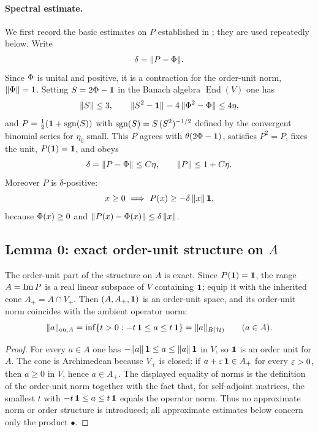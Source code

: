 \paragraph{Spectral estimate.}
We first record the basic estimates on $P$ established in ;
they are used repeatedly below. Write
\[
  \delta=\lVert P-\Phi \rVert.
\]
Since $\Phi$ is unital and positive, it is a contraction for the order-unit
norm, $\lVert \Phi \rVert=1$. Setting $S=2\Phi-\mathbf{1}$ in the Banach algebra
$\operatorname{End}(V)$ one has
\[
  \lVert S \rVert\le3,\qquad \lVert S^2-\mathbf{1} \rVert=4\,\lVert \Phi^2-\Phi \rVert\le4\eta,
\]
and $P=\tfrac12(\mathbf{1}+\operatorname{sgn}(S))$ with $\operatorname{sgn}(S)=S\,(S^2)^{-1/2}$ defined by the
convergent binomial series for $\eta_0$ small. This $P$ agrees with
$\theta(2\Phi-\mathbf{1})$, satisfies $P^2=P$, fixes the unit, $P(\mathbf{1})=\mathbf{1}$, and
obeys
\begin{equation}\label{eq:bridge-delta}
  \delta=\lVert P-\Phi \rVert\le C\eta,\qquad \lVert P \rVert\le1+C\eta.
\end{equation}
Moreover $P$ is $\delta$-positive:
\begin{equation}\label{eq:bridge-deltapos}
  x\ge0\ \Longrightarrow\ P(x)\ge-\delta\,\lVert x \rVert\,\mathbf{1},
\end{equation}
because $\Phi(x)\ge0$ and $\lVert P(x)-\Phi(x) \rVert\le\delta\,\lVert x \rVert$.

\subsection*{Lemma 0: exact order-unit structure on \texorpdfstring{$A$}{A}}

\begin{lemma}\label{lem:bridge-orderunit}
The order-unit part of the structure on $A$ is exact. Since $P(\mathbf{1})=\mathbf{1}$, the
range $A=\operatorname{Im} P$ is a real linear subspace of $V$ containing $\mathbf{1}$; equip it
with the inherited cone $A_+=A\cap V_+$. Then $(A,A_+,\mathbf{1})$ is an order-unit
space, and its order-unit norm coincides with the ambient operator norm:
\[
  \lVert a \rVert_{\mathrm{ou},A}
  =\inf\{t>0:-t\,\mathbf{1}\le a\le t\,\mathbf{1}\}
  =\lVert a \rVert_{B(\mathcal{H})}\qquad(a\in A).
\]
\end{lemma}

\begin{proof}
For every $a\in A$ one has $-\lVert a \rVert\,\mathbf{1}\le a\le\lVert a \rVert\,\mathbf{1}$ in $V$, so
$\mathbf{1}$ is an order unit for $A$. The cone is Archimedean because $V_+$ is closed:
if $a+\varepsilon\,\mathbf{1}\in A_+$ for every $\varepsilon>0$, then $a\ge0$ in $V$, hence
$a\in A_+$. The displayed equality of norms is the definition of the order-unit
norm together with the fact that, for self-adjoint matrices, the smallest $t$
with $-t\,\mathbf{1}\le a\le t\,\mathbf{1}$ equals the operator norm. Thus no approximate
norm or order structure is introduced; all approximate estimates below concern
only the product $\bullet$.
\end{proof}

